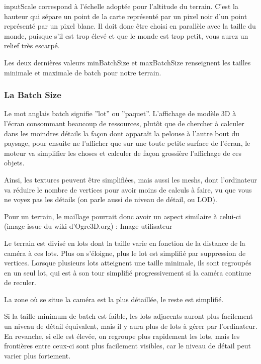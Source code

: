 inputScale correspond à l'échelle adoptée pour l'altitude du terrain. C'est la hauteur qui sépare un point de la carte représenté par un pixel noir d'un point représenté par un pixel blanc. Il doit donc être choisi en parallèle avec la taille du monde, puisque s'il est trop élevé et que le monde est trop petit, vous aurez un relief très escarpé.

Les deux dernières valeurs minBatchSize  et maxBatchSize  renseignent les tailles minimale et maximale de batch pour notre terrain.



\subsubsection{La Batch Size}


Le mot anglais batch signifie ''lot'' ou ''paquet''. L'affichage de modèle 3D à l'écran consommant beaucoup de ressources, plutôt que de chercher à calculer dans les moindres détails la fa\c{c}on dont appara\^it la pelouse à l'autre bout du paysage, pour ensuite ne l'afficher que sur une toute petite surface de l'écran, le moteur va simplifier les choses et calculer de fa\c{c}on grossière l'affichage de ces objets.

Ainsi, les textures peuvent être simplifiées, mais aussi les meshs, dont l'ordinateur va réduire le nombre de vertices pour avoir moins de calculs à faire, vu que vous ne voyez pas les détails (on parle aussi de niveau de détail, ou LOD).

Pour un terrain, le maillage pourrait donc avoir un aspect similaire à celui-ci (image issue du wiki d'Ogre3D.org) :
Image utilisateur

Le terrain est divisé en lots dont la taille varie en fonction de la distance de la caméra à ces lots. Plus on s'éloigne, plus le lot est simplifié par suppression de vertices. Lorsque plusieurs lots atteignent une taille minimale, ils sont regroupés en un seul lot, qui est à son tour simplifié progressivement si la caméra continue de reculer.

La zone o\`u se situe la caméra est la plus détaillée, le reste est simplifié.

Si la taille minimum de batch est faible, les lots adjacents auront plus facilement un niveau de détail équivalent, mais il y aura plus de lots à gérer par l'ordinateur. En revanche, si elle est élevée, on regroupe plus rapidement les lots, mais les frontières entre ceux-ci sont plus facilement visibles, car le niveau de détail peut varier plus fortement.

